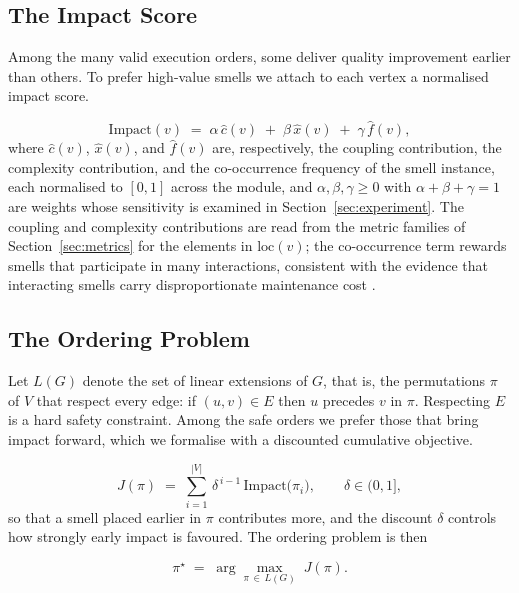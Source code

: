 \documentclass[journal,onecolumn,11pt]{IEEEtran}
\begin{document}
\subsection{The Impact Score}
Among the many valid execution orders, some deliver quality improvement earlier than others. To prefer high-value smells we attach to each vertex a normalised impact score.

\begin{equation}
\label{eq:impact}
\mathrm{Impact}(v)\;=\;\alpha\,\widehat{c}(v)\;+\;\beta\,\widehat{x}(v)\;+\;\gamma\,\widehat{f}(v),
\end{equation}
where $\widehat{c}(v)$, $\widehat{x}(v)$, and $\widehat{f}(v)$ are, respectively, the coupling contribution, the complexity contribution, and the co-occurrence frequency of the smell instance, each normalised to $[0,1]$ across the module, and $\alpha,\beta,\gamma \ge 0$ with $\alpha+\beta+\gamma=1$ are weights whose sensitivity is examined in Section~\ref{sec:experiment}. The coupling and complexity contributions are read from the metric families of Section~\ref{sec:metrics} for the elements in $\mathrm{loc}(v)$; the co-occurrence term rewards smells that participate in many interactions, consistent with the evidence that interacting smells carry disproportionate maintenance cost \cite{yamashita2013}.

\subsection{The Ordering Problem}
Let $L(G)$ denote the set of linear extensions of $G$, that is, the permutations $\pi$ of $V$ that respect every edge: if $(u,v)\in E$ then $u$ precedes $v$ in $\pi$. Respecting $E$ is a hard safety constraint. Among the safe orders we prefer those that bring impact forward, which we formalise with a discounted cumulative objective.

\begin{equation}
\label{eq:objective}
J(\pi)\;=\;\sum_{i=1}^{|V|}\,\delta^{\,i-1}\,\mathrm{Impact}\big(\pi_i\big),
\qquad \delta\in(0,1],
\end{equation}
so that a smell placed earlier in $\pi$ contributes more, and the discount $\delta$ controls how strongly early impact is favoured. The ordering problem is then

\begin{equation}
\label{eq:opt}
\pi^{\star}\;=\;\arg\max_{\pi\,\in\,L(G)}\;J(\pi).
\end{equation}
\end{document}
